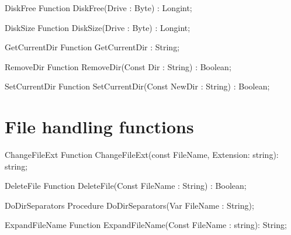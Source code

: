  
\begin{function}{DiskFree}
\Declaration
Function DiskFree(Drive : Byte) : Longint;
\Description
\Errors
\SeeAlso
\end{function}

 
\begin{function}{DiskSize}
\Declaration
Function DiskSize(Drive : Byte) : Longint;
\Description
\Errors
\SeeAlso
\end{function}

 
\begin{function}{GetCurrentDir}
\Declaration
Function GetCurrentDir : String;
\Description
\Errors
\SeeAlso
\end{function}

 
\begin{function}{RemoveDir}
\Declaration
Function RemoveDir(Const Dir : String) : Boolean;
\Description
\Errors
\SeeAlso
\end{function}

 
\begin{function}{SetCurrentDir}
\Declaration
Function SetCurrentDir(Const NewDir : String) : Boolean;
\Description
\Errors
\SeeAlso
\end{function}

 


\section{File handling functions}

      
  
\begin{function}{ChangeFileExt}
\Declaration
Function ChangeFileExt(const FileName, Extension: string): string;
\Description
\Errors
\SeeAlso
\end{function}

 
\begin{function}{DeleteFile}
\Declaration
Function DeleteFile(Const FileName : String) : Boolean;
\Description
\Errors
\SeeAlso
\end{function}

 
\begin{procedure}{DoDirSeparators}
\Declaration
Procedure DoDirSeparators(Var FileName : String);
\Description
\Errors
\SeeAlso
\end{procedure}

 
\begin{function}{ExpandFileName}
\Declaration
Function ExpandFileName(Const FileName : string): String;
\Description
\Errors
\SeeAlso
\end{function}

